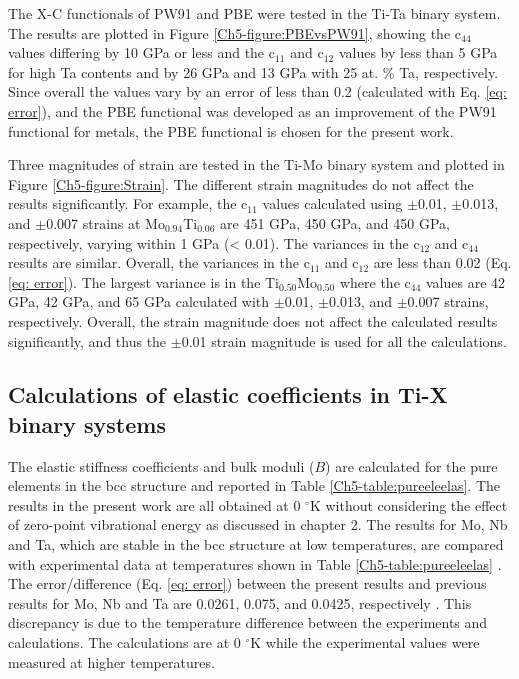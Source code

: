 The X-C functionals of PW91 and PBE were tested in the Ti-Ta binary system. The results are plotted in Figure \ref{Ch5-figure:PBEvsPW91}, showing the c$_{44}$ values differing by 10 GPa or less and the c$_{11}$ and c$_{12}$ values by less than 5 GPa for high Ta contents and by 26 GPa and 13 GPa with 25 at. \% Ta, respectively. Since overall the values vary by an error of less than 0.2 (calculated with Eq. \ref{eq: error}), and the PBE functional was developed as an improvement of the PW91 functional for metals, the PBE functional is chosen for the present work. 

Three magnitudes of strain are tested in the Ti-Mo binary system and plotted in Figure \ref{Ch5-figure:Strain}. The different strain magnitudes do not affect the results significantly. For example, the c$_{11}$ values calculated using $\pm$0.01, $\pm$0.013, and $\pm$0.007 strains at Mo$_{0.94}$Ti$_{0.06}$ are 451 GPa, 450 GPa, and 450 GPa, respectively, varying within 1 GPa (< 0.01). The variances in the c$_{12}$ and c$_{44}$ results are similar. Overall, the variances in the c$_{11}$ and c$_{12}$ are less than 0.02 (Eq. \ref{eq: error}). The largest variance is in the Ti$_{0.50}$Mo$_{0.50}$ where the c$_{44}$ values are 42 GPa, 42 GPa, and 65 GPa calculated with $\pm$0.01, $\pm$0.013, and $\pm$0.007 strains, respectively. Overall, the strain magnitude does not affect the calculated results significantly, and thus the $\pm$0.01 strain magnitude is used for all the calculations.

\subsection{Calculations of elastic coefficients in Ti-X binary systems}

The elastic stiffness coefficients and bulk moduli ($B$) are calculated for the pure elements in the bcc structure and reported in Table \ref{Ch5-table:pureeleelas}. The results in the present work are all obtained at 0 $^\circ$K without considering the effect of zero-point vibrational energy as discussed in chapter 2. The results for Mo, Nb and Ta, which are stable in the bcc structure at low temperatures, are compared with experimental data at temperatures shown in Table \ref{Ch5-table:pureeleelas} \cite{Dickinson1967a,Bolef1961}. The error/difference (Eq. \ref{eq: error}) between the present results and previous results for Mo, Nb and Ta are 0.0261, 0.075, and 0.0425, respectively \cite{Simmons1971b,Dickinson1967a,Bolef1961}. This discrepancy is due to the temperature difference between the experiments and calculations. The calculations are at 0 $^\circ$K while the experimental values were measured at higher temperatures. 

